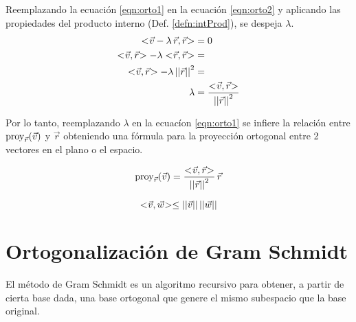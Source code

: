 Reemplazando la ecuación \ref{eqn:orto1} en la ecuación \ref{eqn:orto2} y aplicando las propiedades del producto interno (Def. \ref{defn:intProd}), se despeja $\lambda$.
\begin{align*}
    \intProd{\Vec{v} - \lambda \, \Vec{r}}{\Vec{r}} &= 0
    \\
    \intProd{\Vec{v}}{\Vec{r}} - \lambda \intProd{\Vec{r}}{\Vec{r}} &=
    \\
    \intProd{\Vec{v}}{\Vec{r}} - \lambda \, \nnorm{\Vec{r}}^2 &=
    \\
    \lambda &= \frac{\intProd{\Vec{v}}{\Vec{r}}}{\nnorm{\Vec{r}}^2}
\end{align*}

Por lo tanto, reemplazando $\lambda$ en la ecuacíon \ref{eqn:orto1} se infiere la relación entre $\operatorname{proy}_{\Vec{r}}(\Vec{v})$ y $\Vec{r}$ obteniendo una fórmula para la proyección ortogonal entre 2 vectores en el plano o el espacio.

\begin{mdframed}[style=PropertyFrame]
    \begin{prop}
        \label{prop:proyOrto}
    \end{prop}
    \begin{equation*}
        \operatorname{proy}_{\Vec{r}}(\Vec{v}) = \frac{<\hspace{-0.8mm}\Vec{v},\Vec{r}\hspace{-0.8mm}>}{{\left|\left| {\Vec{r}} \right|\right|}^2} \, \Vec{r}
    \end{equation*}
\end{mdframed}

\begin{mdframed}[style=PropertyFrame]
    \begin{prop}
    \end{prop}
    \begin{equation*}
        <\hspace{-0.8mm}\Vec{v},\Vec{w}\hspace{-0.8mm}> \leq {\left|\left| {\Vec{v}} \right|\right|} \, {\left|\left| {\Vec{w}} \right|\right|}
    \end{equation*}
\end{mdframed}


\section{Ortogonalización de Gram Schmidt}

El método de Gram Schmidt es un algoritmo recursivo para obtener, a partir de cierta base dada, una base ortogonal que genere el mismo subespacio que la base original.

